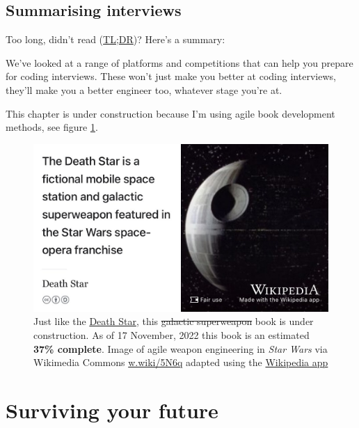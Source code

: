 \documentclass[
]{book}
\begin{document}
\hypertarget{tldr9}{%
\section{Summarising interviews}\label{tldr9}}

Too long, didn't read (\href{https://en.wiktionary.org/wiki/too_long;_didn\%27t_read}{TL;DR})? Here's a summary:

We've looked at a range of platforms and competitions that can help you prepare for coding interviews. These won't just make you better at coding interviews, they'll make you a better engineer too, whatever stage you're at.

This chapter is under construction because I'm using agile book development methods, see figure \ref{fig:deathstar6-fig}.

\begin{figure}

{\centering \includegraphics[width=0.99\linewidth]{images/DeathStar2} 

}

\caption{Just like the \href{https://en.wikipedia.org/wiki/Death_Star}{Death Star}, this \sout{galactic superweapon} book is under construction. As of 17 November, 2022 this book is an estimated \textbf{37\% complete}. Image of agile weapon engineering in \emph{Star Wars} via Wikimedia Commons \href{https://w.wiki/5N6q}{w.wiki/5N6q} adapted using the \href{https://apps.apple.com/gb/app/wikipedia/id324715238}{Wikipedia app}}\label{fig:deathstar6-fig}
\end{figure}

\hypertarget{surviving}{%
\chapter{Surviving your future}\label{surviving}}
\end{document}
